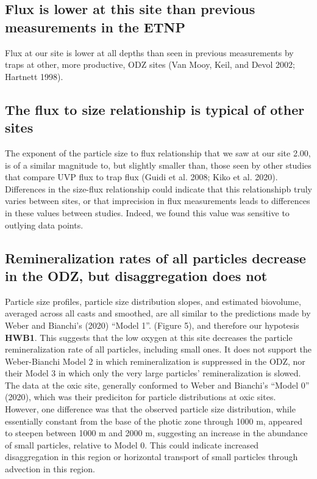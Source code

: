 \documentclass[]{article}
\begin{document}
\hypertarget{flux-is-lower-at-this-site-than-previous-measurements-in-the-etnp}{%
\subsection{Flux is lower at this site than previous measurements in the
ETNP}\label{flux-is-lower-at-this-site-than-previous-measurements-in-the-etnp}}

Flux at our site is lower at all depths than seen in previous
measurements by traps at other, more productive, ODZ sites (Van Mooy,
Keil, and Devol 2002; Hartnett 1998).

\hypertarget{the-flux-to-size-relationship-is-typical-of-other-sites}{%
\subsection{The flux to size relationship is typical of other
sites}\label{the-flux-to-size-relationship-is-typical-of-other-sites}}

The exponent of the particle size to flux relationship that we saw at
our site 2.00, is of a similar magnitude to, but slightly smaller than,
those seen by other studies that compare UVP flux to trap flux (Guidi et
al. 2008; Kiko et al. 2020). Differences in the size-flux relationship
could indicate that this relationshipb truly varies between sites, or
that imprecision in flux measurements leads to differences in these
values between studies. Indeed, we found this value was sensitive to
outlying data points.

\hypertarget{remineralization-rates-of-all-particles-decrease-in-the-odz-but-disaggregation-does-not}{%
\subsection{Remineralization rates of all particles decrease in the ODZ,
but disaggregation does
not}\label{remineralization-rates-of-all-particles-decrease-in-the-odz-but-disaggregation-does-not}}

Particle size profiles, particle size distribution slopes, and estimated
biovolume, averaged across all casts and smoothed, are all similar to
the predictions made by Weber and Bianchi's (2020) ``Model 1''. (Figure
5), and therefore our hypotesis \textbf{HWB1}. This suggests that the
low oxygen at this site decreases the particle remineralization rate of
all particles, including small ones. It does not support the
Weber-Bianchi Model 2 in which remineralization is suppressed in the
ODZ, nor their Model 3 in which only the very large particles'
remineralization is slowed. The data at the oxic site, generally
conformed to Weber and Bianchi's ``Model 0'' (2020), which was their
prediciton for particle distributions at oxic sites. However, one
difference was that the observed particle size distribution, while
essentially constant from the base of the photic zone through 1000 m,
appeared to steepen between 1000 m and 2000 m, suggesting an increase in
the abundance of small particles, relative to Model 0. This could
indicate increased disaggregation in this region or horizontal transport
of small particles through advection in this region.
\end{document}
